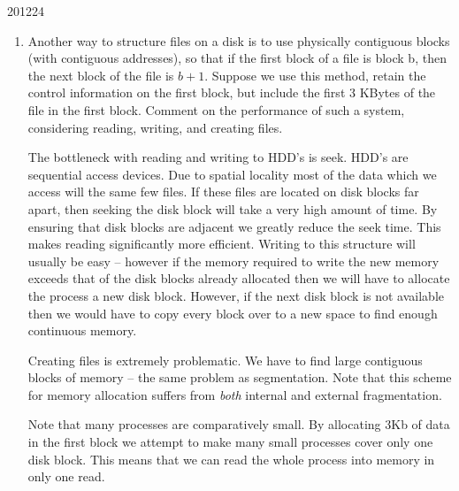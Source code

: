 \documentclass[10pt,\jkfside,a4paper]{article}
\begin{document}
\begin{examquestion}{2012}{2}{4}
\begin{enumerate}
\begin{enumerate}
\end{enumerate}

\item Another way to structure files on a disk is to use physically contiguous blocks
(with contiguous addresses), so that if the first block of a file is block b, then the
next block of the file is $b + 1$. Suppose we use this method, retain the control
information on the first block, but include the first 3 KBytes of the file in the
first block. Comment on the performance of such a system, considering reading,
writing, and creating files.

The bottleneck with reading and writing to HDD's is seek. HDD's are sequential 
access devices. Due to spatial locality 
most of the data which we access will the same few files. If these files 
are located on disk blocks far apart, then seeking the disk block will take a 
very high amount of time. By ensuring that disk blocks are adjacent we greatly reduce 
the seek time. This makes reading significantly more efficient. Writing to this structure 
will usually be easy -- however if the memory required to write the new memory exceeds 
that of the disk blocks already allocated then we will have to allocate the process 
a new disk block. However, if the next disk block is not available then we would have 
to copy every block over to a new space to find enough continuous memory.

Creating files is extremely problematic. We have to find large contiguous blocks of memory 
-- the same problem as segmentation. Note that this scheme for memory allocation 
suffers from \textit{both} internal and external fragmentation.

Note that many processes are comparatively small. By allocating 3Kb of data in the first 
block we attempt to make many small processes cover only one disk block. This means that 
we can read the whole process into memory in only one read.

\end{enumerate}

\end{examquestion}
\end{document}
